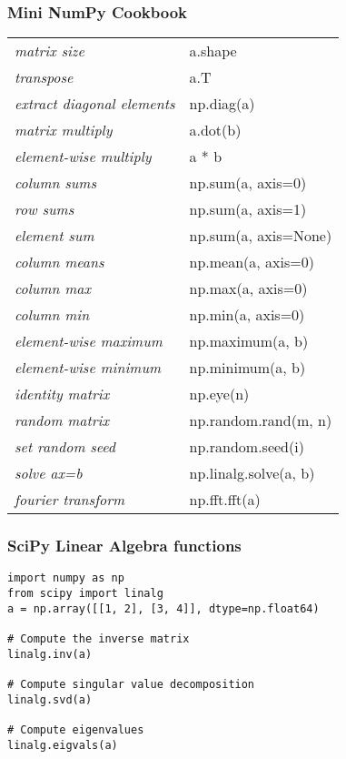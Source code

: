 \documentclass[10pt]{beamer}
\begin{document}
\begin{frame}[fragile]
\frametitle{Mini NumPy Cookbook}

\begin{tabular}{l l}
\textit{matrix size}               & a.shape \\
\textit{transpose}                 & a.T \\
\textit{extract diagonal elements} & np.diag(a) \\
\textit{matrix multiply}           & a.dot(b) \\
\textit{element-wise multiply}     & a * b \\
\textit{column sums}               & np.sum(a, axis=0) \\
\textit{row sums}                  & np.sum(a, axis=1) \\
\textit{element sum}               & np.sum(a, axis=None) \\
\textit{column means}              & np.mean(a, axis=0) \\
\textit{column max}                & np.max(a, axis=0) \\
\textit{column min}                & np.min(a, axis=0) \\
\textit{element-wise maximum}      & np.maximum(a, b) \\
\textit{element-wise minimum}      & np.minimum(a, b) \\
\textit{identity matrix}           & np.eye(n) \\
\textit{random matrix}             & np.random.rand(m, n) \\
\textit{set random seed}           & np.random.seed(i) \\
\textit{solve ax=b}                & np.linalg.solve(a, b) \\
\textit{fourier transform}         & np.fft.fft(a) \\

\end{tabular}

\end{frame}

\begin{frame}[fragile]
\frametitle{SciPy Linear Algebra functions}
\begin{verbatim}
import numpy as np
from scipy import linalg
a = np.array([[1, 2], [3, 4]], dtype=np.float64)

# Compute the inverse matrix
linalg.inv(a)

# Compute singular value decomposition
linalg.svd(a)

# Compute eigenvalues
linalg.eigvals(a)
\end{verbatim}
\end{frame}
\end{document}
